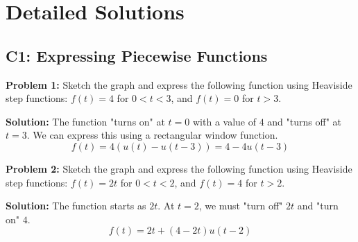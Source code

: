 \documentclass[11pt, letterpaper]{article}
\theoremstyle{definition}
\theoremstyle{remark}
\begin{document}
\newpage

\section{Detailed Solutions}

\subsection{C1: Expressing Piecewise Functions}

\textbf{Problem 1:} Sketch the graph and express the following function using Heaviside step functions: $f(t) = 4$ for $0 < t < 3$, and $f(t) = 0$ for $t > 3$.

\textbf{Solution:}
The function "turns on" at $t=0$ with a value of $4$ and "turns off" at $t=3$. We can express this using a rectangular window function.
\[ f(t) = 4(u(t) - u(t-3)) = 4 - 4u(t-3) \]

\begin{center}
\end{center}

\vspace{1em}
\textbf{Problem 2:} Sketch the graph and express the following function using Heaviside step functions: $f(t) = 2t$ for $0 < t < 2$, and $f(t) = 4$ for $t > 2$.

\textbf{Solution:}
The function starts as $2t$. At $t=2$, we must "turn off" $2t$ and "turn on" $4$.
\[ f(t) = 2t + (4 - 2t)u(t-2) \]
\end{document}
